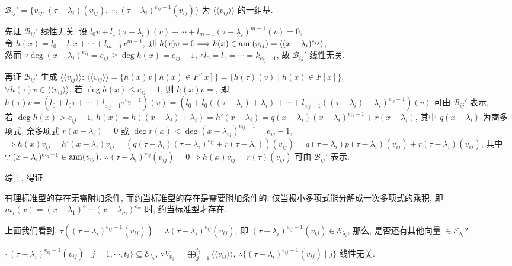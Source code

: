 \documentclass{note}
\begin{document}
$\mathcal{B}_{ij}'=\{v_{ij},(\tau-\lambda_i)(v_{ij}),\cdots,(\tau-\lambda_i)^{e_{ij}-1}(v_{ij})\}$ 为 $\langle\langle v_{ij}\rangle\rangle$ 的一组基.
\begin{pf}
    先证 $\mathcal{B}_{ij}'$ 线性无关: 设 $l_0v+l_1(\tau-\lambda_i)(v)+\cdots+l_{m-1}(\tau-\lambda_i)^{m-1}(v)=0$,\\
    令 $h(x)=l_0+l_1x+\cdots+l_{m-1}x^{m-1}$, 则 $h(x)v=0\Longrightarrow h(x)\in\operatorname{ann}(v_{ij})=\langle(x-\lambda_i)^{e_{ij}}\rangle$,\\
    然而 $\because\deg(x-\lambda_i)^{e_{ij}}=e_{ij}\geq\deg h(x)=e_{ij}-1$, $\therefore l_0=l_1=\cdots=k_{e_{ij}-1}$, 故 $\mathcal{B}_{ij}'$ 线性无关.

    再证 $\mathcal{B}_{ij}'$ 生成 $\langle\langle v_{ij}\rangle\rangle$: $\langle\langle v_{ij}\rangle\rangle=\{h(x)v\mid h(x)\in F[x]\}=\{h(\tau)(v)\mid h(x)\in F[x]\}$,\\
    $\forall h(\tau)v\in\langle\langle v_{ij}\rangle\rangle$, 若 $\deg h(x)\leq e_{ij}-1$, 则 $h(x)v=$, 即 $h(\tau)v=(l_0+l_0\tau+\cdots+l_{e_{ij}-1}\tau^{e_{ij}-1})(v)=(l_0+l_0((\tau-\lambda_i)+\lambda_i)+\cdots+l_{e_{ij}-1}((\tau-\lambda_i)+\lambda_i)^{e_{ij}-1})(v)$ 可由 $\mathcal{B}_{ij}'$ 表示,\\
    若 $\deg h(x)>e_{ij}-1$, $h(x)=h((x-\lambda_i)+\lambda_i)=h'(x-\lambda_i)=q(x-\lambda_i)(x-\lambda_i)^{e_{ij}-1}+r(x-\lambda_i)$, 其中 $q(x-\lambda_i)$ 为商多项式, 余多项式 $r(x-\lambda_i)=0$ 或 $\deg r(x)<\deg(x-\lambda_{ij})^{e_{ij}-1}=e_{ij}-1$,\\
    $\Longrightarrow h(x)v_{ij}=h'(x-\lambda_i)v_{ij}=(q(\tau-\lambda_i)(\tau-\lambda_i)^{e_{ij}}+r(\tau-\lambda_i))(v_{ij})=q(\tau-\lambda_i)p(\tau-\lambda_i)(v_{ij})+r(\tau-\lambda_i)(v_{ij})$, 其中 $\because(x-\lambda_i)^{e_{ij}-1}\in\operatorname{ann}(v_{ij})$, $\therefore(\tau-\lambda_i)^{e_{ij}}(v_{ij})=0\Longrightarrow h(x)v_{ij}=r(\tau)(v_{ij})$ 可由 $\mathcal{B}_{ij}'$ 表示.

    综上, 得证.
\end{pf}

有理标准型的存在无需附加条件, 而约当标准型的存在是需要附加条件的: 仅当极小多项式能分解成一次多项式的乘积, 即 $m_{\tau}(x)=(x-\lambda_1)^{e_1}\cdots(x-\lambda_m)^{e_m}$ 时, 约当标准型才存在.

上面我们看到, $\tau((\tau-\lambda_i)^{e_{ij}-1}(v_{ij}))=\lambda(\tau-\lambda_i)^{e_{ij}}(v_{ij})$, 即 $(\tau-\lambda_i)^{e_{ij}-1}(v_{ij})\in\mathcal{E}_{\lambda_i}$, 那么, 是否还有其他向量 $\in\mathcal{E}_{\lambda_i}$?

$\{(\tau-\lambda_i)^{e_{ij}-1}(v_{ij})\mid j=1,\cdots,t_i\}\subseteq\mathcal{E}_{\lambda_i}$, $\because V_{p_i}=\bigoplus_{j=1}^{t_i}\langle\langle v_{ij}\rangle\rangle$, $\therefore\{(\tau-\lambda_i)^{e_{ij}-1}(v_{ij})\mid j\}$ 线性无关.
\end{document}
